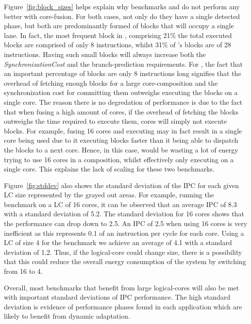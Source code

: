 Figure~\ref{fig:block_sizes} helps explain why benchmarks  and  do not perform any better with core-fusion.
For both cases, not only do they have a single detected phase, but both are predominantly formed of blocks that will occupy a single lane.
In fact, the most frequent block in , comprising 21\% the total executed blocks are comprised of only 8 instructions, whilst 31\% of 's blocks are of 28 instructions.
Having such small blocks will always increase both the \textit{SynchronizationCost} and the branch-prediction requirements.
For , the fact that an important percentage of blocks are only 8 instructions long signifies that the overhead of fetching enough blocks for a large core-composition and the synchronization cost for committing them outweighs executing the blocks on a single core.
The reason there is no degredation of performance is due to the fact that when fusing a high amount of cores, if the overhead of fetching the blocks outweighs the time required to execute them, cores will simply not execute blocks.
For example, fusing 16 cores and executing  may in fact result in a single core being used due to it executing blocks faster than it being able to dispatch the blocks to a next core.
Hence, in this case,  would be wasting a lot of energy trying to use 16 cores in a composition, whilst effectively only executing on a single core. 
This explains the lack of scaling for these two benchmarks.

Figure~\ref{fig:stddev} also shows the standard deviation of the IPC for each given LC size represented by the grayed out areas.
For example, running the  benchmark on a LC of 16 cores, it can be observed that an average IPC of 8.3 with a standard deviation of 5.2.
The standard deviation for 16 cores shows that the performance can drop down to 2.5.
An IPC of 2.5 when using 16 cores is very inefficient as this represents 0.1 of an instruction per cycle for each core.
Using a LC of size 4 for the  benchmark we achieve an average of 4.1 with a standard deviation of 1.2.
Thus, if the logical-core could change size, there is a possibility that this could reduce the overall energy consumption of the system by switching from 16 to 4.

Overall, most benchmarks that benefit from large logical-cores will also be met with important standard deviations of IPC performance.
The high standard deviation is evidence of performance phases found in each application which are likely to benefit from dynamic adaptation.
